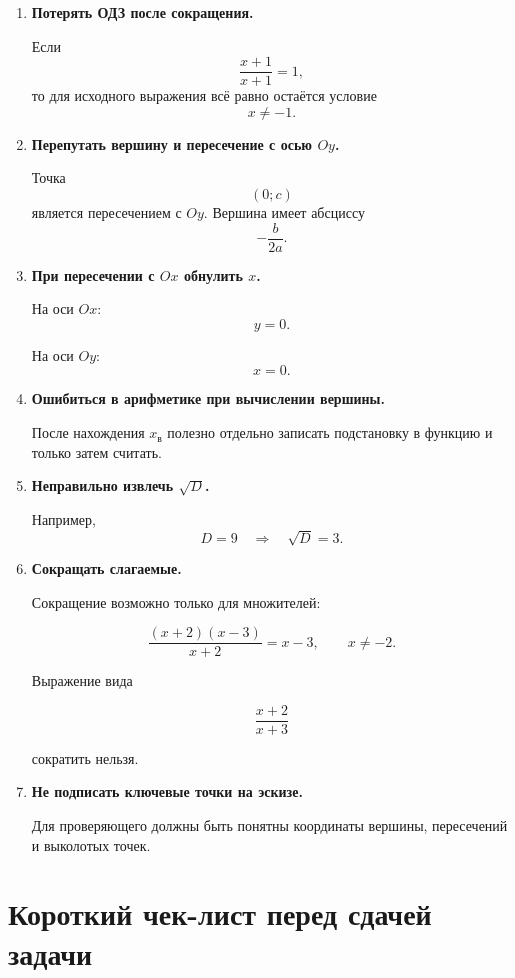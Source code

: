 \documentclass[a4paper,12pt]{article}
\newcommand{\term}[1]{\textbf{\textcolor{darkaccent}{#1}}}
\begin{document}
\begin{enumerate}
  \item
  \term{Потерять ОДЗ после сокращения.}

  Если
  \[
  \frac{x+1}{x+1}=1,
  \]
  то для исходного выражения всё равно остаётся условие
  \[
  x\ne-1.
  \]

  \item
  \term{Перепутать вершину и пересечение с осью \(Oy\).}

  Точка
  \[
  (0;c)
  \]
  является пересечением с \(Oy\).
  Вершина имеет абсциссу
  \[
  -\frac{b}{2a}.
  \]

  \item
  \term{При пересечении с \(Ox\) обнулить \(x\).}

  На оси \(Ox\):
  \[
  \boxed{y=0}.
  \]

  На оси \(Oy\):
  \[
  \boxed{x=0}.
  \]

  \item
  \term{Ошибиться в арифметике при вычислении вершины.}

  После нахождения \(x_{\mathrm{в}}\) полезно отдельно записать
  подстановку в функцию и только затем считать.

  \item
  \term{Неправильно извлечь \(\sqrt D\).}

  Например,
  \[
  D=9
  \quad\Longrightarrow\quad
  \sqrt D=3.
  \]

  \item
  \term{Сокращать слагаемые.}

  Сокращение возможно только для множителей:

  \[
  \frac{(x+2)(x-3)}{x+2}=x-3,
  \qquad x\ne-2.
  \]

  Выражение вида

  \[
  \frac{x+2}{x+3}
  \]

  сократить нельзя.

  \item
  \term{Не подписать ключевые точки на эскизе.}

  Для проверяющего должны быть понятны координаты вершины,
  пересечений и выколотых точек.
\end{enumerate}

\section{Короткий чек-лист перед сдачей задачи}
\end{document}
